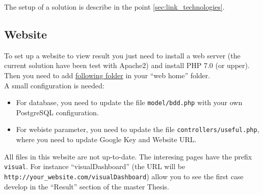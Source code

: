 \documentclass[a4paper,12pt]{article}
\begin{document}
        The setup of a solution is describe in the point \ref{sec:link_technologies}.
        
        
    \subsection{Website}
        \label{sec:webiste}
        To set up a website to view result you just need to install a web server (the current solution have been test with Apache2) and install PHP 7.0 (or upper).\\
        
        Then you need to add \href{https://github.com/detobel36/MobilityDBComparison/tree/master/Website}{following folder} in your ``web home'' folder.\\
        
        A small configuration is needed:
        \begin{itemize}
            \item For database, you need to update the file \verb|model/bdd.php| with your own PostgreSQL configuration.
            \item For webiste parameter, you need to update the file \verb|controllers/useful.php|, where you need to update Google Key and Website URL.
        \end{itemize}
        
        All files in this website are not up-to-date. The interesing pages have the prefix \verb|visual|. For instance ``visualDashboard'' (the URL will be \verb|http://your_website.com/visualDashboard|) allow you to see the first case develop in the ``Result'' section of the master Thesis.\\
        
\end{document}
